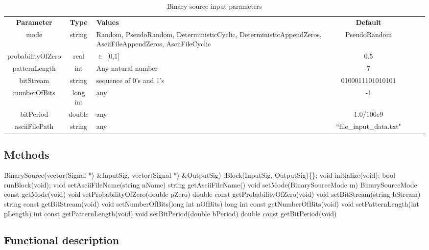 \begin{table}[h]
	\centering
	\begin{tabular}{|c|c|p{60mm}|c|ccp{60mm}}
		\cline{1-4}
		\textbf{Parameter} & \textbf{Type} & \textbf{Values} &   \textbf{Default}& \\ \cline{1-4}
		mode & string & Random, PseudoRandom, DeterministicCyclic, DeterministicAppendZeros, AsciiFileAppendZeros, AsciiFileCyclic & PseudoRandom \\ \cline{1-4}
		probabilityOfZero & real & $\in$ [0,1] & 0.5 \\ \cline{1-4}
		patternLength & int &  Any natural number & 7 \\ \cline{1-4}
		bitStream & string & sequence of 0's and 1's & 0100011101010101 \\ \cline{1-4}
		numberOfBits & long int & any & -1 \\ \cline{1-4}
		bitPeriod & double & any & $1.0/100e9$ \\ \cline{1-4}
        asciiFilePath & string & any & ``file\_input\_data.txt" \\ \cline{1-4}
	\end{tabular}
	\caption{Binary source input parameters}
	\label{table:bin_sour_in_par}
\end{table}

\subsection*{Methods}

BinarySource(vector$\langle$Signal *$\rangle$ \&InputSig, vector$\langle$Signal *$\rangle$ \&OutputSig) :Block(InputSig, OutputSig)\{\};
\bigbreak	
void initialize(void);
\bigbreak	
bool runBlock(void);
\bigbreak
void setAsciiFileName(string nName)
\bigbreak
string getAsciiFileName()	
\bigbreak
void setMode(BinarySourceMode m)
\bigbreak
BinarySourceMode const getMode(void)
\bigbreak	
void setProbabilityOfZero(double pZero)
\bigbreak
double const getProbabilityOfZero(void)
\bigbreak	
void setBitStream(string bStream)
\bigbreak
string const getBitStream(void)
\bigbreak	
void setNumberOfBits(long int nOfBits)
\bigbreak
long int const getNumberOfBits(void)
\bigbreak	
void setPatternLength(int pLength)
\bigbreak
int const getPatternLength(void)
\bigbreak	
void setBitPeriod(double bPeriod)
\bigbreak
double const getBitPeriod(void)

\subsection*{Functional description}

